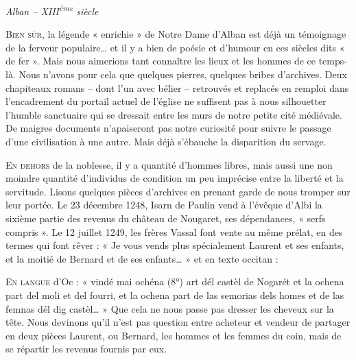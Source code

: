
\begin{center}
  {\Large\itshape Alban – XIII\textsuperscript{ème} siècle}
\end{center}
\vspace{1.2em}

\noindent
\lettrine{B}{ien sûr}, la légende « enrichie » de Notre Dame d’Alban est déjà un témoignage de la ferveur populaire… et il y a bien de poésie et d’humour en ces siècles dits « de fer ». Mais nous aimerions tant connaître les lieux et les hommes de ce temps-là. Nous n’avons pour cela que quelques pierres, quelques bribes d’archives. Deux chapiteaux romans – dont l’un avec bélier – retrouvés et replacés en remploi dans l’encadrement du portail actuel de l’église ne suffisent pas à nous silhouetter l’humble sanctuaire qui se dressait entre les murs de notre petite cité médiévale. De maigres documents n’apaiseront pas notre curiosité pour suivre le passage d’une civilisation à une autre. Mais déjà s’ébauche la disparition du servage.

\medskip

\noindent
\lettrine{E}{n dehors} de la noblesse, il y a quantité d’hommes libres, mais aussi une non moindre quantité d’individus de condition un peu imprécise entre la liberté et la servitude. Lisons quelques pièces d’archives en prenant garde de nous tromper sur leur portée. Le 23 décembre 1248, Isarn de Paulin vend à l’évêque d’Albi la sixième partie des revenus du château de Nougaret, ses dépendances, « serfs compris ». Le 12 juillet 1249, les frères Vassal font vente au même prélat, en des termes qui font rêver : « Je vous vends plus spécialement Laurent et ses enfants, et la moitié de Bernard et de ses enfants… » et en texte occitan :

\medskip

\noindent
\lettrine{E}{n langue} d’Oc : « vindé mai ochéna (8°) art dél castèl de Nogarét et la ochena part del moli et del fourri, et la ochena part de las semorias dels homes et de las femnas dél dig castèl… » Que cela ne nous passe pas dresser les cheveux sur la tête. Nous devinons qu’il n’est pas question entre acheteur et vendeur de partager en deux pièces Laurent, ou Bernard, les hommes et les femmes du coin, mais de se répartir les revenus fournis par eux.
